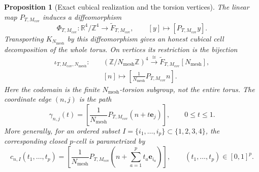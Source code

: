 \documentclass[11pt]{article}
\newtheorem{proposition}[theorem]{Proposition}
\theoremstyle{definition}
\numberwithin{equation}{section}
\begin{document}
\begin{proposition}[Exact cubical realization and the torsion vertices]
\label{cusp-link-cubical-realization}
The linear map \(P_{T,M_{\mathrm{cov}}}\) induces a diffeomorphism
\begin{equation}
 \Phi_{T,M_{\mathrm{cov}}}:\mathbb R^4/\mathbb Z^4
 \longrightarrow\widetilde F_{T,M_{\mathrm{cov}}},
 \qquad [y]\longmapsto[P_{T,M_{\mathrm{cov}}}y].
 \label{cusp-link-coordinate-diffeomorphism}
\end{equation}
Transporting \(K_{N_{\mathrm{mesh}}}\) by this diffeomorphism gives an
honest cubical cell decomposition of the whole torus.  On vertices its
restriction is the bijection
\begin{equation}
 \begin{aligned}
 \iota_{T,M_{\mathrm{cov}},N_{\mathrm{mesh}}}:\quad
 &(\mathbb Z/N_{\mathrm{mesh}}\mathbb Z)^4
 \xrightarrow{\ \cong\ }
 \widetilde F_{T,M_{\mathrm{cov}}}[N_{\mathrm{mesh}}],\\
 &[n]\longmapsto
 \left[\frac1{N_{\mathrm{mesh}}}P_{T,M_{\mathrm{cov}}}n\right].
 \end{aligned}
 \label{cusp-link-torsion-bijection}
\end{equation}
Here the codomain is the finite \(N_{\mathrm{mesh}}\)-torsion subgroup,
not the entire torus.  The coordinate edge \((n,j)\) is the path
\begin{equation}
 \gamma_{n,j}(t)=
 \left[
  \frac1{N_{\mathrm{mesh}}}
  P_{T,M_{\mathrm{cov}}}(n+t\mathbf e_j)
 \right],
 \qquad 0\leq t\leq1.
 \label{cusp-link-coordinate-edge}
\end{equation}
More generally, for an ordered subset
\(I=\{i_1,\ldots,i_p\}\subset\{1,2,3,4\}\), the corresponding closed
\(p\)-cell is parametrized by
\begin{equation}
 c_{n,I}(t_1,\ldots,t_p)=
 \left[
  \frac1{N_{\mathrm{mesh}}}P_{T,M_{\mathrm{cov}}}
  \left(n+\sum_{a=1}^pt_a\mathbf e_{i_a}\right)
 \right],
 \qquad (t_1,\ldots,t_p)\in[0,1]^p.
 \label{cusp-link-general-cell}
\end{equation}
\end{proposition}
\end{document}
